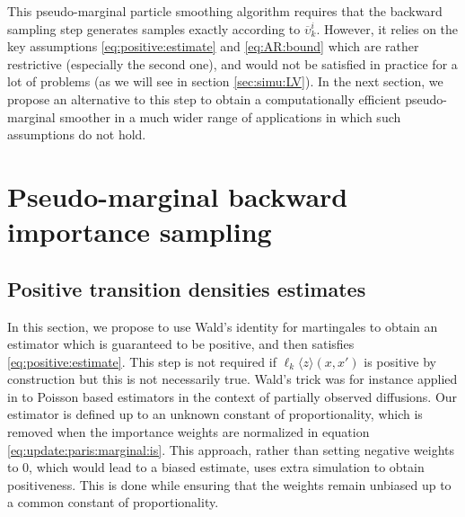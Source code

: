 \documentclass{article}
\newcommand{\kernelmarg}{\mathbf{R}}
\newcommand{\hatqg}[1]{\mathsf{\ell}_{#1}}
\begin{document}
This pseudo-marginal particle smoothing algorithm  requires that the backward sampling step  generates samples exactly according to $\overline \upsilon_k^i$.  
However, it relies on the key assumptions \eqref{eq:positive:estimate} and \eqref{eq:AR:bound} which are rather restrictive (especially the second one), and would not be satisfied in practice for a lot of problems (as we will see in section \ref{sec:simu:LV}).
 In the next section, we propose an alternative to this step to obtain a computationally efficient pseudo-marginal smoother in a much wider range of applications in which such assumptions do not hold.


\section{Pseudo-marginal backward importance sampling}
\label{sec:backwardis}


\subsection{Positive transition densities estimates}
In this section, we propose to use Wald’s identity for martingales to obtain an  estimator which is guaranteed to be positive, and then satisfies \eqref{eq:positive:estimate}.  
This step is not required if $\hatqg{k}\langle z\rangle(x,x')$ is positive by construction but this is not necessarily true.
 Wald's trick was for instance applied in \cite{fearnhead2010random} to Poisson based estimators in the context of partially observed diffusions. Our estimator is defined up to an unknown constant of proportionality, which is removed when the importance weights are normalized in equation \eqref{eq:update:paris:marginal:is}. 
This approach, rather than setting negative weights to 0, which would lead to a biased estimate, uses extra simulation to obtain positiveness. 
This is done while ensuring that the weights remain unbiased up to a common constant of proportionality.%
\end{document}
